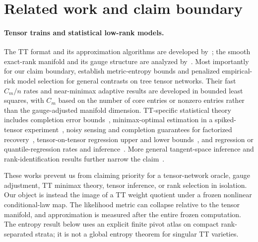 \section{Related work and claim boundary}
\label{sec:related}

\paragraph{Tensor trains and statistical low-rank models.}
The TT format and its approximation algorithms are developed by~\citet{oseledets2011tt}; the smooth exact-rank manifold and its gauge structure are analyzed by~\citet{holtz2012manifolds}. Most importantly for our claim boundary, \citet{michel2022tree} establish metric-entropy bounds and penalized empirical-risk model selection for general contrasts on tree tensor networks. Their fast \(C_m/n\) rates and near-minimax adaptive results are developed in bounded least squares, with \(C_m\) based on the number of core entries or nonzero entries rather than the gauge-adjusted manifold dimension. TT-specific statistical theory includes completion error bounds~\citep{imaizumi2017ttrank}, minimax-optimal estimation in a spiked-tensor experiment~\citep{zhou2022ttoi}, noisy sensing and completion guarantees for factorized recovery~\citep{qinwakin2024ttrecovery}, tensor-on-tensor regression upper and lower bounds~\citep{qin2024ttregression}, and regression or quantile-regression rates and inference~\citep{liu2024ttquantile,peng2025ttregression}. More general tangent-space inference and rank-identification results further narrow the claim~\citep{xu2025tensorinference,silva2026rank}.

These works prevent us from claiming priority for a tensor-network oracle, gauge adjustment, TT minimax theory, tensor inference, or rank selection in isolation. Our object is instead the image of a TT weight quotient under a frozen nonlinear conditional-law map. The likelihood metric can collapse relative to the tensor manifold, and approximation is measured after the entire frozen computation. The entropy result below uses an explicit finite pivot atlas on compact rank-separated strata; it is not a global entropy theorem for singular TT varieties.

